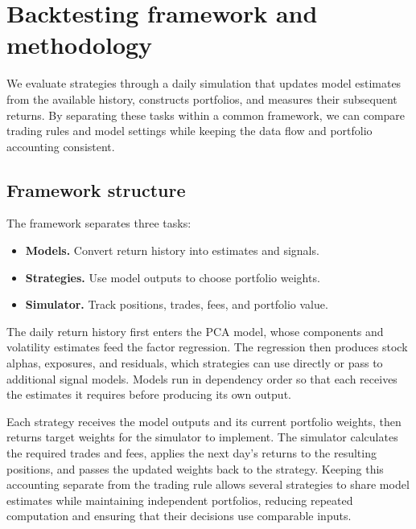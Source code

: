 \section{Backtesting framework and methodology}
\label{sec:framework}

We evaluate strategies through a daily simulation that updates model
estimates from the available history, constructs portfolios, and measures
their subsequent returns. By separating these tasks within a common
framework, we can compare trading rules and model settings while keeping
the data flow and portfolio accounting consistent.

\subsection{Framework structure}

The framework separates three tasks:
\begin{itemize}
    \item \textbf{Models.} Convert return history into estimates and signals.
    \item \textbf{Strategies.} Use model outputs to choose portfolio weights.
    \item \textbf{Simulator.} Track positions, trades, fees, and portfolio value.
\end{itemize}
The daily return history first enters the PCA model, whose components
and volatility estimates feed the factor regression. The regression then
produces stock alphas, exposures, and residuals, which strategies can use
directly or pass to additional signal models.
Models run in dependency order so that each receives the estimates it
requires before producing its own output.

Each strategy receives the model outputs and its current portfolio
weights, then returns target weights for the simulator to implement.
The simulator calculates the required trades and fees, applies the next
day's returns to the resulting positions, and passes the updated weights
back to the strategy. Keeping this accounting separate from the trading
rule allows several strategies to share model estimates while maintaining
independent portfolios, reducing repeated computation and ensuring that
their decisions use comparable inputs.

